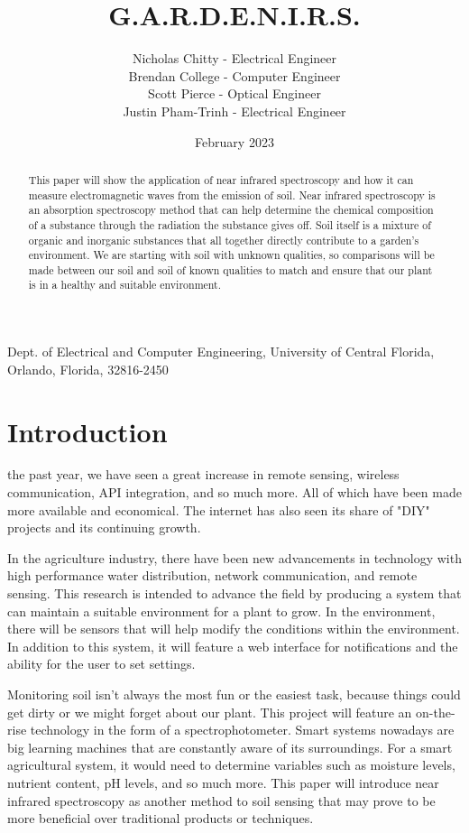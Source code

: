 \documentclass[journal]{IEEEtran}
\title{G.A.R.D.E.N.I.R.S.}
\author{Nicholas Chitty - Electrical Engineer
\\Brendan College - Computer Engineer
\\Scott Pierce - Optical Engineer
\\Justin Pham-Trinh - Electrical Engineer}
\date{February 2023}
\begin{document}
\maketitle

\begin{center}
   \large Dept. of Electrical and Computer Engineering, University of Central Florida, Orlando, 
   Florida, 32816-2450
\end{center}

\begin{abstract}
   This paper will show the application of near infrared spectroscopy 
and how it can measure electromagnetic waves from the emission of soil. Near infrared spectroscopy 
is an absorption spectroscopy method that can help determine the chemical composition of a 
substance through the radiation the substance gives off. Soil itself is a mixture of organic and 
inorganic substances that all together directly contribute to a garden’s environment. We are 
starting with soil with unknown qualities, so comparisons will be made between our soil and soil 
of known qualities to match and ensure that our plant is in a healthy and suitable environment. 
\end{abstract}

\section{Introduction}
 the past year, we have seen a great increase in remote sensing, wireless 
communication, API integration, and so much more. All of which have been made more available and 
economical. The internet has also seen its share of "DIY" projects and its continuing growth.

In the agriculture industry, there have been new advancements in technology with high performance 
water distribution, network communication, and remote sensing. This research is intended to advance
the field by producing a system that can maintain a suitable environment for a plant to grow. In the 
environment, there will be sensors that will help modify the conditions within the environment. In 
addition to this system, it will feature a web interface for notifications and the ability for the 
user to set settings.

Monitoring soil isn't always the most fun or the easiest task, because things could get dirty or we 
might forget about our plant. This project will feature an on-the-rise technology in the form of a 
spectrophotometer. Smart systems nowadays are big learning machines that are constantly aware of its 
surroundings. For a smart agricultural system, it would need to determine variables such as moisture 
levels, nutrient content, pH levels, and so much more. This paper will introduce near infrared 
spectroscopy as another method to soil sensing that may prove to be more beneficial over traditional 
products or techniques.
\end{document}
